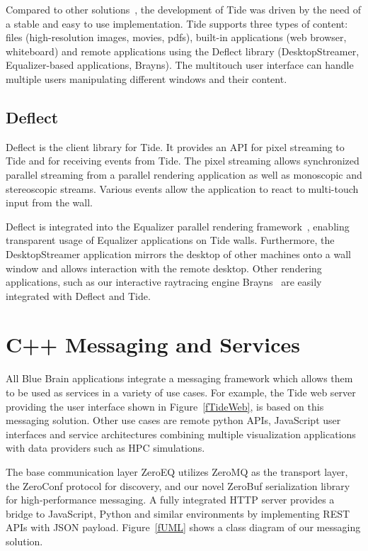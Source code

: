 \documentclass[10pt]{llncs}
\newcommand{\fig}[1]{Figure~\ref{#1}}
\begin{document}
Compared to other solutions~\cite{Sage,Sage2,DisplayCluster}, the development of
Tide was driven by the need of a stable and easy to use implementation. Tide
supports three types of content: files (high-resolution images, movies, pdfs),
built-in applications (web browser, whiteboard) and remote applications using
the Deflect library (DesktopStreamer, Equalizer-based applications, Brayns).
The multitouch user interface can handle multiple users manipulating different
windows and their content.

\subsection{Deflect}

Deflect is the client library for Tide. It provides an API for pixel streaming
to Tide and for receiving events from Tide. The pixel streaming allows
synchronized parallel streaming from a parallel rendering application as well
as monoscopic and stereoscopic streams. Various events allow the application to
react to multi-touch input from the wall.

Deflect is integrated into the Equalizer parallel rendering
framework~\cite{EMP:09}, enabling transparent usage of Equalizer applications on
Tide walls. Furthermore, the DesktopStreamer application mirrors the desktop of
other machines onto a wall window and allows interaction with the remote
desktop. Other rendering applications, such as our interactive raytracing
engine Brayns~\cite{brayns} are easily integrated with Deflect and Tide.

\section{C++ Messaging and Services}

All Blue Brain applications integrate a messaging framework which allows them
to be used as services in a variety of use cases. For example, the Tide web
server providing the user interface shown in \fig{fTideWeb}, is based on this
messaging solution. Other use cases are remote python APIs, JavaScript user
interfaces and service architectures combining multiple visualization
applications with data providers such as HPC simulations.

The base communication layer ZeroEQ utilizes ZeroMQ as the transport layer, the
ZeroConf protocol for discovery, and our novel ZeroBuf serialization library for
high-performance messaging. A fully integrated HTTP server provides a bridge to
JavaScript, Python and similar environments by implementing REST APIs with JSON
payload. \fig{fUML} shows a class diagram of our messaging solution.
\end{document}
